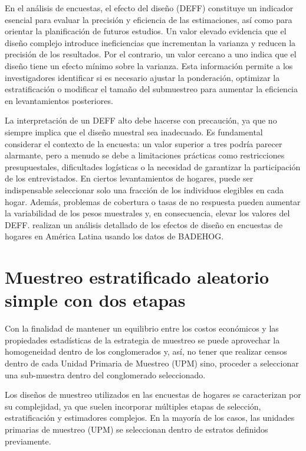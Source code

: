 \documentclass[
  spanish,
  12pt,
]{book}
\begin{document}
En el análisis de encuestas, el efecto del diseño (DEFF) constituye un indicador esencial para evaluar la precisión y eficiencia de las estimaciones, así como para orientar la planificación de futuros estudios. Un valor elevado evidencia que el diseño complejo introduce ineficiencias que incrementan la varianza y reducen la precisión de los resultados. Por el contrario, un valor cercano a uno indica que el diseño tiene un efecto mínimo sobre la varianza. Esta información permite a los investigadores identificar si es necesario ajustar la ponderación, optimizar la estratificación o modificar el tamaño del submuestreo para aumentar la eficiencia en levantamientos posteriores.

La interpretación de un DEFF alto debe hacerse con precaución, ya que no siempre implica que el diseño muestral sea inadecuado. Es fundamental considerar el contexto de la encuesta: un valor superior a tres podría parecer alarmante, pero a menudo se debe a limitaciones prácticas como restricciones presupuestales, dificultades logísticas o la necesidad de garantizar la participación de los entrevistados. En ciertos levantamientos de hogares, puede ser indispensable seleccionar solo una fracción de los individuos elegibles en cada hogar. Además, problemas de cobertura o tasas de no respuesta pueden aumentar la variabilidad de los pesos muestrales y, en consecuencia, elevar los valores del DEFF. \citet{GutierrezBabativa2023} realizan un análisis detallado de los efectos de diseño en encuestas de hogares en América Latina usando los datos de BADEHOG.

\section{Muestreo estratificado aleatorio simple con dos etapas}\label{muestreo-estratificado-aleatorio-simple-con-dos-etapas}

Con la finalidad de mantener un equilibrio entre los costos económicos y las propiedades estadísticas de la estrategia de muestreo se puede aprovechar la homogeneidad dentro de los conglomerados y, así, no tener que realizar censos dentro de cada Unidad Primaria de Muestreo (UPM) sino, proceder a seleccionar una sub-muestra dentro del conglomerado seleccionado.

Los diseños de muestreo utilizados en las encuestas de hogares se caracterizan por su complejidad, ya que suelen incorporar múltiples etapas de selección, estratificación y estimadores complejos. En la mayoría de los casos, las unidades primarias de muestreo (UPM) se seleccionan dentro de estratos definidos previamente.
\end{document}
